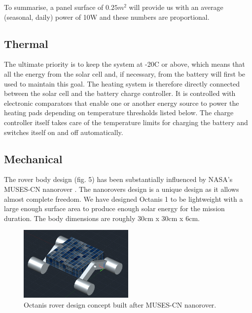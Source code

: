\documentclass[a4paper,12pt]{article}
\begin{document}
To summarise, a panel surface of $0.25m^2$ will provide us with an average (seasonal, daily) power of 10W and these numbers are proportional. 


\subsection{Thermal}

The ultimate priority is to keep the system at -20\degree C or above, which means that all the energy from the solar cell and, if necessary, from the battery will first be used to maintain this goal. The heating system is therefore directly connected between the solar cell and the battery charge controller. It is controlled with electronic comparators that enable one or another energy source to power the heating pads depending on temperature thresholds listed below. The charge controller itself takes care of the temperature limits for charging the battery and switches itself on and off automatically. 


\subsection{Mechanical}
The rover body design (fig. 5) has been substantially influenced by NASA's MUSES-CN nanorover \cite{muses}. The nanorovers design is a unique design as it allows almost complete freedom. We have designed Octanis 1 to be lightweight with a large enough surface area to produce enough solar energy for the mission duration. The body dimensions are roughly 30cm x 30cm x 6cm.

\begin{figure}[h!]
	\centering
    \includegraphics[width=0.5\textwidth]{conceptrover}
    \caption{Octanis rover design concept built after MUSES-CN nanorover.}
\end{figure}
\end{document}
